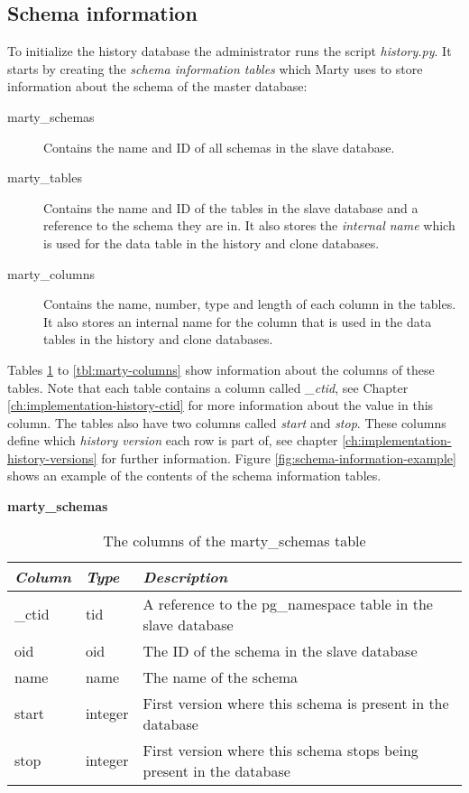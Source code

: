 \subsection{Schema information}
To initialize the history database the administrator runs the script \textit{history.py}.
It starts by creating the \textit{schema information tables} which Marty uses to store information about the schema of the master database:

\begin{description}
  \item[marty\_schemas]
    Contains the name and ID of all schemas in the slave database.
  \item[marty\_tables]
    Contains the name and ID of the tables in the slave database and a reference to the schema they are in.
    It also stores the \textit{internal name} which is used for the data table in the history and clone databases.
  \item[marty\_columns]
    Contains the name, number, type and length of each column in the tables.
    It also stores an internal name for the column that is used in the data tables in the history and clone databases.
\end{description}

Tables \ref{tbl:marty-schemas} to \ref{tbl:marty-columns} show information about the columns of these tables.
Note that each table contains a column called \textit{\_ctid}, see Chapter \ref{ch:implementation-history-ctid} for more information about the value in this column.
The tables also have two columns called \textit{start} and \textit{stop}.
These columns define which \textit{history version} each row is part of, see chapter \ref{ch:implementation-history-versions} for further information.
Figure \ref{fig:schema-information-example} shows an example of the contents of the schema information tables.

\begin{table}[h]
  \centering
  \textbf{marty\_schemas}
  \begin{tabularx}{\textwidth}{llX}
    \textit{Column} & \textit{Type} & \textit{Description} \\
    \midrule
    \_ctid & tid & A reference to the pg\_namespace table in the slave database \\
    oid & oid & The ID of the schema in the slave database \\
    name & name & The name of the schema \\
    start & integer & First version where this schema is present in the database \\
    stop & integer & First version where this schema stops being present in the database \\
  \end{tabularx}
  \caption{The columns of the marty\_schemas table}
  \label{tbl:marty-schemas}
\end{table}

